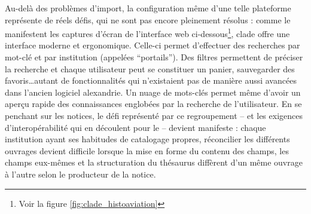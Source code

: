 Au-delà des problèmes d'import, la configuration même d'une telle plateforme représente de réels défis, qui ne sont pas encore pleinement résolus : comme le manifestent les captures d'écran de l'interface web ci-dessous\footnote{Voir la figure \ref{fig:clade_histoaviation}}, \gls{clade} offre une interface moderne et ergonomique. Celle-ci permet d'effectuer des recherches par mot-clé et par institution (appelées \enquote{portails}). Des filtres permettent de préciser la recherche et chaque utilisateur peut se constituer un panier, sauvegarder des favoris\dots autant de fonctionnalités qui n'existaient pas de manière aussi avancées dans l'ancien logiciel \gls{alexandrie}. Un nuage de mots-clés permet même d'avoir un aperçu rapide des connaissances englobées par la recherche de l'utilisateur. En se penchant sur les notices, le défi représenté par ce regroupement -- et les exigences d'interopérabilité qui en découlent pour le \mae -- devient manifeste : chaque institution ayant ses habitudes de catalogage propres, réconcilier les différents ouvrages devient difficile lorsque la mise en forme du contenu des champs, les champs eux-mêmes et la structuration du thésaurus diffèrent d'un même ouvrage à l'autre selon le producteur de la notice.


